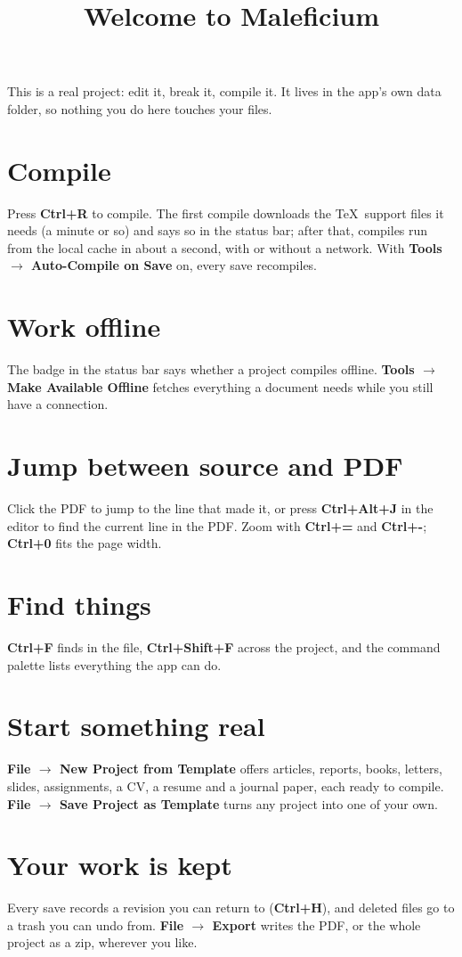 \documentclass[11pt]{article}
\title{Welcome to Maleficium}
\author{}
\date{}
\begin{document}
\maketitle

This is a real project: edit it, break it, compile it. It lives in the
app's own data folder, so nothing you do here touches your files.

\section{Compile}
Press \textbf{Ctrl+R} to compile. The first compile downloads the \TeX\
support files it needs (a minute or so) and says so in the status bar;
after that, compiles run from the local cache in about a second, with or
without a network. With \textbf{Tools $\rightarrow$ Auto-Compile on Save}
on, every save recompiles.

\section{Work offline}
The badge in the status bar says whether a project compiles offline.
\textbf{Tools $\rightarrow$ Make Available Offline} fetches everything a
document needs while you still have a connection.

\section{Jump between source and PDF}
Click the PDF to jump to the line that made it, or press
\textbf{Ctrl+Alt+J} in the editor to find the current line in the PDF.
Zoom with \textbf{Ctrl+=} and \textbf{Ctrl+-}; \textbf{Ctrl+0} fits the
page width.

\section{Find things}
\textbf{Ctrl+F} finds in the file, \textbf{Ctrl+Shift+F} across the
project, and the command palette lists everything the app can do.

\section{Start something real}
\textbf{File $\rightarrow$ New Project from Template} offers articles,
reports, books, letters, slides, assignments, a CV, a resume and a journal
paper, each ready to compile. \textbf{File $\rightarrow$ Save Project as
Template} turns any project into one of your own.

\section{Your work is kept}
Every save records a revision you can return to (\textbf{Ctrl+H}), and
deleted files go to a trash you can undo from. \textbf{File $\rightarrow$
Export} writes the PDF, or the whole project as a zip, wherever you like.
\end{document}
